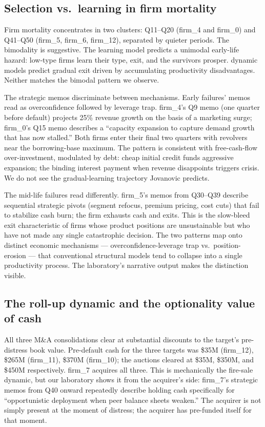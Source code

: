 \documentclass[11pt]{article}
\begin{document}
\subsection{Selection vs.\ learning in firm mortality}

Firm mortality concentrates in two clusters: Q11--Q20 (firm\_4 and
firm\_0) and Q41--Q50 (firm\_5, firm\_6, firm\_12), separated by
quieter periods. The bimodality is suggestive. The
\citet{jovanovic1982} learning model predicts a unimodal early-life
hazard: low-type firms learn their type, exit, and the survivors
prosper. \citet{ericsonpakes1995} dynamic models predict gradual
exit driven by accumulating productivity disadvantages. Neither
matches the bimodal pattern we observe.

The strategic memos discriminate between mechanisms. Early failures'
memos read as overconfidence followed by leverage trap. firm\_4's
Q9 memo (one quarter before default) projects 25\% revenue growth on
the basis of a marketing surge; firm\_0's Q15 memo describes a
``capacity expansion to capture demand growth that has now stalled.''
Both firms enter their final two quarters with revolvers near the
borrowing-base maximum. The pattern is consistent with
\citet{jensen1986agency} free-cash-flow over-investment, modulated
by debt: cheap initial credit funds aggressive expansion; the binding
interest payment when revenue disappoints triggers crisis. We do
not see the gradual-learning trajectory Jovanovic predicts.

The mid-life failures read differently. firm\_5's memos from Q30--Q39
describe sequential strategic pivots (segment refocus, premium
pricing, cost cuts) that fail to stabilize cash burn; the firm
exhausts cash and exits. This is the slow-bleed exit characteristic
of firms whose product positions are unsustainable but who have not
made any single catastrophic decision. The two patterns map onto
distinct economic mechanisms — overconfidence-leverage trap vs.\
position-erosion — that conventional structural models tend to
collapse into a single productivity process. The laboratory's
narrative output makes the distinction visible.

\subsection{The roll-up dynamic and the optionality value of cash}

All three M\&A consolidations clear at substantial discounts to the
target's pre-distress book value. Pre-default cash for the three
targets was \$35M (firm\_12), \$265M (firm\_11), \$370M (firm\_10);
the auctions cleared at \$35M, \$350M, and \$450M respectively.
firm\_7 acquires all three. This is mechanically the
\citet{shleifervishny1992} fire-sale dynamic, but our laboratory
shows it from the acquirer's side: firm\_7's strategic memos from Q40
onward repeatedly describe holding cash specifically for
``opportunistic deployment when peer balance sheets weaken.'' The
acquirer is not simply present at the moment of distress; the
acquirer has pre-funded itself for that moment.
\end{document}
